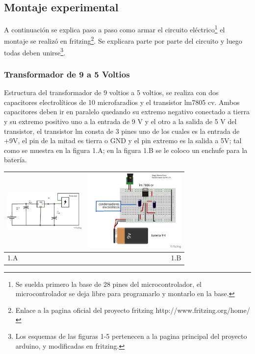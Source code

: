 \documentclass[12]{article}
\newenvironment{Figure}
{\par\medskip\noindent\minipage{\linewidth}}
{\endminipage\par\medskip}
\begin{document}
\begin{multicols}{2}
\subsection{Montaje experimental}
A continuación se explica paso a paso como armar el circuito eléctrico\footnote{Se suelda primero la base de 28 pines del microcontrolador, el microcontrolador se deja libre para programarlo y montarlo en la base.} el montaje se realizó en fritzing\footnote{Enlace a la pagina oficial del proyecto fritzing http://www.fritzing.org/home/}. Se explicara parte por parte del circuito y luego todas deben unirse\footnote{Los esquemas de las figuras  1-5 pertenecen a la pagina principal del proyecto arduino\cite{ARDUINO}, y modificadas en fritzing\cite{FRITZING}.}.
\subsubsection{Transformador de 9 a 5 Voltios}
Estructura del transformador de 9 voltios a 5 voltios, se realiza con dos capacitores electrolíticos de 10 microfaradios  y el transistor lm7805\cite{REGULADOR} cv. Ambos  capacitores deben ir en paralelo quedando su extremo negativo conectado a tierra y su extremo positivo uno a la entrada de 9 V y el otro a la salida de 5 V del transistor, el transistor lm consta de 3 pines uno de los cuales es la entrada de +9V, el pin de la mitad es tierra o GND y el pin extremo es la salida a 5V; tal como se muestra en la figura 1.A; en la figura 1.B se le coloco un enchufe para la batería. 
\begin{Figure}
\center
\begin{tabular}{|l|r|}
\hline
\includegraphics[width=4cm, height=4cm]{img/esquematrans.png}  & \includegraphics[width=4.cm, height=4cm]{img/montajetr5V.png} \\ \hline
1.A & 1.B \\ \hline
\end{tabular}
\label{fig:g1}
\end{Figure}

\end{multicols}
\end{document}
